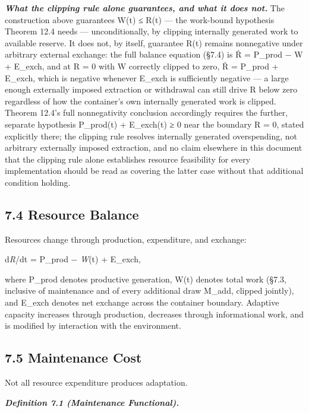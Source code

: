 \documentclass[
]{article}
\begin{document}
\emph{\textbf{What the clipping rule alone guarantees, and what it does
not.}} The construction above guarantees W(t) ≤ R(t) --- the work-bound
hypothesis Theorem 12.4 needs --- unconditionally, by clipping
internally generated work to available reserve. It does not, by itself,
guarantee R(t) remains nonnegative under arbitrary external exchange:
the full balance equation (§7.4) is Ṙ = P\_prod − W + E\_exch, and at R
= 0 with W correctly clipped to zero, Ṙ = P\_prod + E\_exch, which is
negative whenever E\_exch is sufficiently negative --- a large enough
externally imposed extraction or withdrawal can still drive R below zero
regardless of how the container's own internally generated work is
clipped. Theorem 12.4's full nonnegativity conclusion accordingly
requires the further, separate hypothesis P\_prod(t) + E\_exch(t) ≥ 0
near the boundary R = 0, stated explicitly there; the clipping rule
resolves internally generated overspending, not arbitrary externally
imposed extraction, and no claim elsewhere in this document that the
clipping rule alone establishes resource feasibility for every
implementation should be read as covering the latter case without that
additional condition holding.

\hypertarget{resource-balance}{%
\subsection{7.4 Resource Balance}\label{resource-balance}}

Resources change through production, expenditure, and exchange:

d\emph{R}/dt = P\_prod − \emph{W}(t) + E\_exch,

where P\_prod denotes productive generation, W(t) denotes total work
(§7.3, inclusive of maintenance and of every additional draw M\_add,
clipped jointly), and E\_exch denotes net
exchange across the container boundary. Adaptive capacity increases
through production, decreases through informational work, and is
modified by interaction with the environment.

\hypertarget{maintenance-cost}{%
\subsection{7.5 Maintenance Cost}\label{maintenance-cost}}

Not all resource expenditure produces adaptation.

\emph{\textbf{Definition 7.1 (Maintenance Functional).}}
\end{document}
